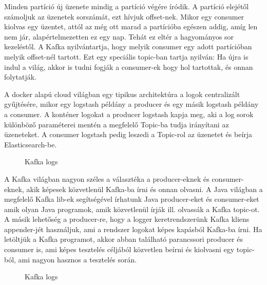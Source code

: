 Minden partíció új üzenete mindig a partíció végére íródik. A partíció elejétől számoljuk az üzenetek sorszámát, ezt hívjuk offset-nek. Mikor egy consumer kiolvas egy üzentet, attól az még ott marad a partícióba egészen addig, amíg len nem jár, alapértelmezetten ez egy nap. Tehát ez eltér a hagyományos sor kezeléstől. A Kafka nyilvántartja, hogy melyik consumer egy adott partícióban melyik offset-nél tartott. Ezt egy speciális topic-ban tartja nyilván: Ha újra is indul a világ, akkor is tudni fogják a consumer-ek hogy hol tartottak, és onnan folytatják.


A docker alapú cloud világban egy tipikus architektúra a logok centralizált gyűjtésére, mikor egy logstash példány a producer és egy másik logstash példány a consumer. A konténer logokat a producer logstash kapja meg, aki a log sorok különböző paraméterei mentén a megfelelő Topic-ba tudja irányítani az üzeneteket. A consumer logstash pedig leszedi a Topic-rol az üzenetet és beírja Elasticsearch-be. 

\begin{figure}[ht]
	\centering
	\caption{Kafka logs} 
	\label{fig:kafka-elastic}
\end{figure}

A Kafka világban nagyon széles a választéka a producer-eknek és consumer-eknek, akik képesek közvetlenül Kafka-ba írni és onnan olvasni. A Java világban a megfelelő Kafka lib-ek segítségével írhatunk Java producer-eket és consumer-eket amik olyan Java programok, amik közvetlenül írják ill. olvassák a Kafka topic-ot. A másik lehetőség a producer-re, hogy a logger keretrendszerünk Kafka kliens appender-jét használjuk, ami a rendszer logokat képes kapásból Kafka-ba írni. Ha letöltjük a Kafka programot, akkor abban található parancssori producer és consumer is, ami képes tesztelés céljából közvetlen beírni és kiolvasni egy topic-ból, ami nagyon hasznos a tesztelés során.

\begin{figure}[ht]
	\centering
	\caption{Kafka logs} 
	\label{fig:kafka-java}
\end{figure}

     